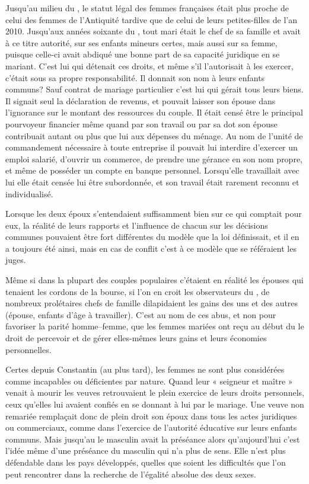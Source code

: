  Jusqu'au milieu du , le statut légal des femmes françaises était plus proche de celui des femmes de l'Antiquité tardive que de celui de leurs petites-filles de l'an 2010. Jusqu'aux années soixante du , tout mari était le chef de sa famille et avait à ce titre autorité, sur ses enfants mineurs certes, mais aussi sur sa femme, puisque celle-ci avait abdiqué une bonne part de sa capacité juridique en se mariant. C'est lui qui détenait ces droits, et même s'il l'autorisait à les exercer, c'était sous sa propre responsabilité. Il donnait son nom à leurs enfants communs? Sauf contrat de mariage particulier c'est lui qui gérait tous leurs biens. Il signait seul la déclaration de revenus, et pouvait laisser son épouse dans l'ignorance sur le montant des ressources du couple. Il était censé être le principal pourvoyeur financier même quand par son travail ou par sa dot son épouse contribuait autant ou plus que lui aux dépenses du ménage. Au nom de l'unité de commandement nécessaire à toute entreprise il pouvait lui interdire d'exercer un emploi salarié, d'ouvrir un commerce, de prendre une gérance en son nom propre, et même de posséder un compte en banque personnel. Lorsqu'elle travaillait avec lui elle était censée lui être subordonnée, et son travail était rarement reconnu et individualisé. 

 Lorsque les deux époux s'entendaient suffisamment bien sur ce qui comptait pour eux, la réalité de leurs rapports et l'influence de chacun sur les décisions communes pouvaient être fort différentes du modèle que la loi définissait, et il en a toujours été ainsi, mais en cas de conflit c'est à ce modèle que se référaient les juges.

  Même si dans la plupart des couples populaires c'étaient en réalité les épouses qui tenaient les cordons de la bourse, si l'on en croit les observateurs du , de nombreux prolétaires chefs de famille dilapidaient les gains des uns et des autres (épouse, enfants d'âge à travailler). C'est au nom de ces abus, et non pour favoriser la parité homme--femme, que les femmes mariées ont reçu au début du  le droit de percevoir et de gérer elles-mêmes leurs gains et leurs économies personnelles.

 Certes depuis Constantin (au plus tard), les femmes ne sont plus considérées comme incapables ou déficientes par nature. Quand leur « seigneur et maître » venait à mourir les veuves  retrouvaient le plein exercice de leurs droits personnels, ceux qu'elles lui avaient confiés en se donnant à lui par le mariage. Une veuve non remariée remplaçait donc de plein droit son époux dans tous les actes juridiques ou commerciaux, comme dans l'exercice de l'autorité éducative sur leurs enfants communs. Mais jusqu'au  le masculin avait la préséance alors qu'aujourd'hui c'est l'idée même d'une préséance du masculin qui n'a plus de sens. Elle n'est plus défendable dans les pays développés, quelles que soient les difficultés que l'on peut rencontrer dans la recherche de l'égalité absolue des deux sexes.

